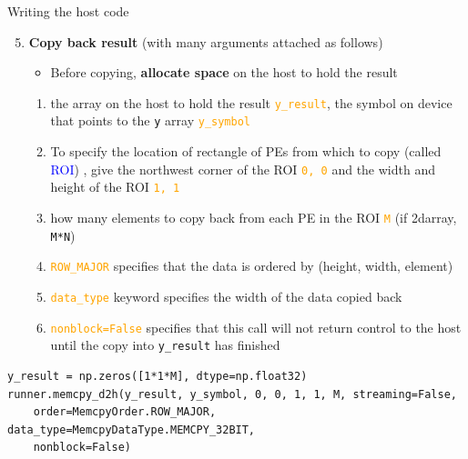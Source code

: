 \documentclass[dvipdfmx, 11pt, aspectratio=169]{beamer}   %
\begin{document}
\begin{frame}[fragile]{Writing the host code}
\begin{enumerate}\setcounter{enumi}{4}
    \item \textbf{Copy back result} (with many arguments attached as follows)
    \begin{itemize}
        \item Before copying, \textbf{allocate space} on the host to hold the result
    \end{itemize}
    \begin{enumerate}
        \item the array on the host to hold the result \textcolor{orange}{\lstinline|y_result|}, the symbol on device that points to the \lstinline|y| array \textcolor{orange}{\lstinline|y_symbol|}
        \item To specify the location of rectangle of PEs from which to copy (called \textcolor{blue}{ROI})%
        , give the northwest corner of the ROI \textcolor{orange}{\lstinline|0, 0|} and the width and height of the ROI \textcolor{orange}{\lstinline|1, 1|}
        \item how many elements to copy back from each PE in the ROI \textcolor{orange}{\lstinline|M|} (if 2darray, \lstinline|M*N|)
        \item \textcolor{orange}{\lstinline|ROW_MAJOR|} specifies that the data is ordered by (height, width, element)
        \item \textcolor{orange}{\lstinline|data_type|} keyword specifies the width of the data copied back
        \item \textcolor{orange}{\lstinline|nonblock=False|} specifies that this call will not return control to the host until the copy into \lstinline|y_result| has finished 
    \end{enumerate}
\end{enumerate}
\begin{lstlisting}[language=CSL]
y_result = np.zeros([1*1*M], dtype=np.float32)
runner.memcpy_d2h(y_result, y_symbol, 0, 0, 1, 1, M, streaming=False,
    order=MemcpyOrder.ROW_MAJOR, data_type=MemcpyDataType.MEMCPY_32BIT,
    nonblock=False)
\end{lstlisting}
\end{frame}
\end{document}
